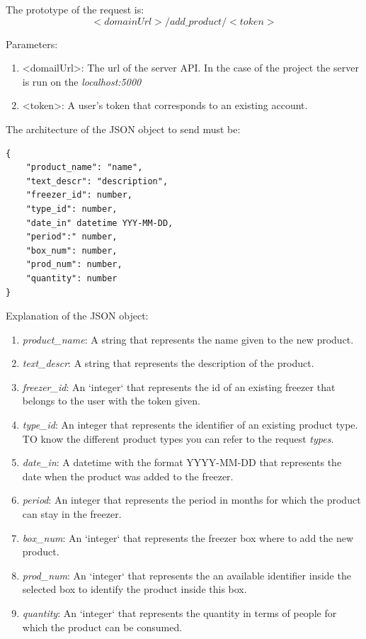 The prototype of the request is:
$$<domainUrl>/add\_product/<token>$$

Parameters:
\begin{enumerate}
\item <domailUrl>: The url of the server API. In the case of the project the server is run on the \textit{localhost:5000}
\item <token>: A user's token that corresponds to an existing account.
\end{enumerate}

The architecture of the JSON object to send must be:
\begin{lstlisting}
{
    "product_name": "name",
    "text_descr": "description",
    "freezer_id": number,
    "type_id": number,
    "date_in" datetime YYY-MM-DD,
    "period":" number,
    "box_num": number,
    "prod_num": number,
    "quantity": number
}
\end{lstlisting}

Explanation of the  JSON object:
\begin{enumerate}
\item \textit{product\_name}: A string that represents the name given to the new product.
\item \textit{text\_descr}: A string that represents the description of the product.
\item \textit{freezer\_id}: An `integer` that represents the id of an existing freezer that belongs to the user with the token given.
\item \textit{type\_id}: An integer that represents the identifier of an existing product type. TO know the different product types you can refer to the request \textit{types}.
\item \textit{date\_in}: A datetime with the format YYYY-MM-DD that represents the date when the product was added to the freezer.
\item \textit{period}: An integer that represents the period in months for which the product can stay in the freezer.
\item \textit{box\_num}: An `integer` that represents the freezer box where to add the new product.
\item \textit{prod\_num}: An `integer` that represents the an available identifier inside the selected box to identify the product inside this box.
\item \textit{quantity}: An `integer` that represents the quantity in terms of people for which the product can be consumed.
\end{enumerate}


